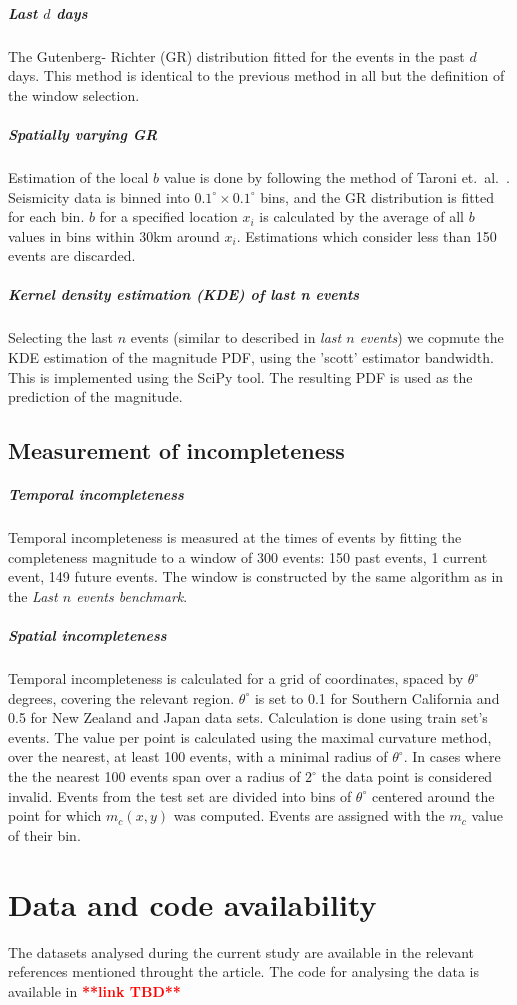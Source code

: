 \documentclass[pdflatex]{sn-jnl}
\begin{document}
\subparagraph{Last $d$ days} The Gutenberg- Richter (GR) distribution fitted for the events in the past $d$ days. This method is identical to the previous method in all but the definition of the window selection.

\subparagraph{Spatially varying GR} Estimation of the local $b$ value is done by following the method of Taroni et.~al.~\cite{taroni_highdefinition_2021}. Seismicity data is 
binned into $0.1^\circ \times 0.1^\circ$ bins, and the GR distribution is fitted for each bin. $b$ for a specified location $x_i$ is calculated by the average of all $b$ values in bins within 30km around $x_i$. Estimations which consider less than 150 events are discarded.

\subparagraph{Kernel density estimation (KDE) of last n events} Selecting the last $n$ events (similar to described in \textit{last $n$ events}) we copmute the KDE estimation of the magnitude PDF, using the 'scott' estimator bandwidth\cite{scott_2015}. This is implemented using the SciPy tool\cite{scipy_2020}. The resulting PDF is used as the prediction of the magnitude.

\subsection{Measurement of incompleteness}
\subparagraph{Temporal incompleteness} Temporal incompleteness is measured at the times of events by fitting the completeness magnitude to a window of 300 events: 150 past events, 1 current event, 149 future events. The window is constructed by the same algorithm as in the \textit{Last $n$ events benchmark}.

\subparagraph{Spatial incompleteness} Temporal incompleteness is calculated for a grid of coordinates, spaced by $\theta^\circ$ degrees, covering the relevant region. $\theta^\circ$ is set to 0.1 for Southern California and 0.5 for New Zealand and Japan data sets. Calculation is done using train set's events. The value per point is calculated using the maximal curvature method\cite{wiemer_minimum_2000}, over the nearest, at least 100 events, with a minimal radius of $\theta^\circ$. In cases where the the nearest 100 events span over a radius of $2^\circ$ the data point is considered invalid. Events from the test set are divided into bins of $\theta^\circ$ centered around the point for which $m_c(x,y)$ was computed. Events are assigned with the $m_c$ value of their bin.


\section*{Data and code availability}
The datasets analysed during the current study are available in the relevant references mentioned throught the article.
The code for analysing the data is available in \textcolor{red}{\textbf{**link TBD**}}
\end{document}
